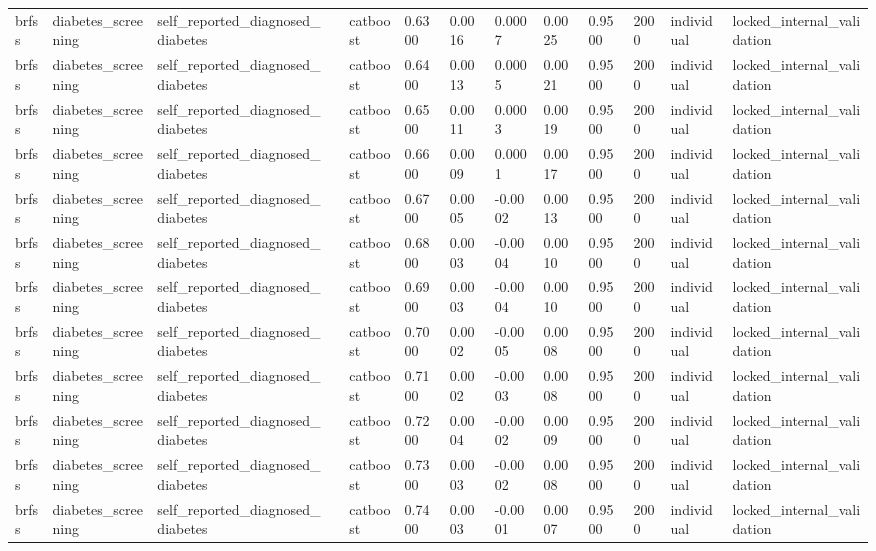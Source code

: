 \begin{tabular}{lllllllllllll}
brfss & diabetes\_screening & self\_reported\_diagnosed\_diabetes &  & catboost & 0.6300 & 0.0016 & 0.0007 & 0.0025 & 0.9500 & 2000 & individual & locked\_internal\_validation \\
brfss & diabetes\_screening & self\_reported\_diagnosed\_diabetes &  & catboost & 0.6400 & 0.0013 & 0.0005 & 0.0021 & 0.9500 & 2000 & individual & locked\_internal\_validation \\
brfss & diabetes\_screening & self\_reported\_diagnosed\_diabetes &  & catboost & 0.6500 & 0.0011 & 0.0003 & 0.0019 & 0.9500 & 2000 & individual & locked\_internal\_validation \\
brfss & diabetes\_screening & self\_reported\_diagnosed\_diabetes &  & catboost & 0.6600 & 0.0009 & 0.0001 & 0.0017 & 0.9500 & 2000 & individual & locked\_internal\_validation \\
brfss & diabetes\_screening & self\_reported\_diagnosed\_diabetes &  & catboost & 0.6700 & 0.0005 & -0.0002 & 0.0013 & 0.9500 & 2000 & individual & locked\_internal\_validation \\
brfss & diabetes\_screening & self\_reported\_diagnosed\_diabetes &  & catboost & 0.6800 & 0.0003 & -0.0004 & 0.0010 & 0.9500 & 2000 & individual & locked\_internal\_validation \\
brfss & diabetes\_screening & self\_reported\_diagnosed\_diabetes &  & catboost & 0.6900 & 0.0003 & -0.0004 & 0.0010 & 0.9500 & 2000 & individual & locked\_internal\_validation \\
brfss & diabetes\_screening & self\_reported\_diagnosed\_diabetes &  & catboost & 0.7000 & 0.0002 & -0.0005 & 0.0008 & 0.9500 & 2000 & individual & locked\_internal\_validation \\
brfss & diabetes\_screening & self\_reported\_diagnosed\_diabetes &  & catboost & 0.7100 & 0.0002 & -0.0003 & 0.0008 & 0.9500 & 2000 & individual & locked\_internal\_validation \\
brfss & diabetes\_screening & self\_reported\_diagnosed\_diabetes &  & catboost & 0.7200 & 0.0004 & -0.0002 & 0.0009 & 0.9500 & 2000 & individual & locked\_internal\_validation \\
brfss & diabetes\_screening & self\_reported\_diagnosed\_diabetes &  & catboost & 0.7300 & 0.0003 & -0.0002 & 0.0008 & 0.9500 & 2000 & individual & locked\_internal\_validation \\
brfss & diabetes\_screening & self\_reported\_diagnosed\_diabetes &  & catboost & 0.7400 & 0.0003 & -0.0001 & 0.0007 & 0.9500 & 2000 & individual & locked\_internal\_validation \\

\end{tabular}

